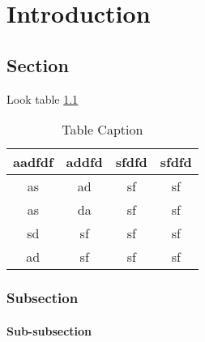 \chapter{Introduction}\label{intro}
\section{Section}
Look table \ref{tab:my_label} \lipsum[2-4] 

\begin{table}
    \centering
    \caption{Table Caption}
    \label{tab:my_label}
    \begin{tabular}{|c|c|c|c|}
    \hline
       aadfdf  & addfd & sfdfd & sfdfd \\ \hline
       as  & ad & sf & sf \\ \hline
       as  &  da & sf & sf \\ \hline
       sd  & sf & sf & sf\\ \hline
       ad  & sf &  sf& sf \\ \hline
    \end{tabular}
    
\end{table}

\subsection{Subsection}
\lipsum[2-4]
\subsubsection{Sub-subsection}
\lipsum[2-4]








